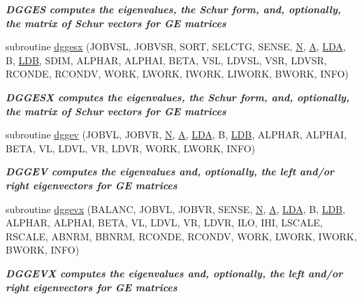 \begin{DoxyCompactItemize}
\begin{DoxyCompactList}\small\item\em {\bfseries  D\+G\+G\+E\+S computes the eigenvalues, the Schur form, and, optionally, the matrix of Schur vectors for G\+E matrices} \end{DoxyCompactList}\item 
subroutine \hyperlink{group__doubleGEeigen_ga923e1df287c0a880641462ce42607936}{dggesx} (J\+O\+B\+V\+S\+L, J\+O\+B\+V\+S\+R, S\+O\+R\+T, S\+E\+L\+C\+T\+G, S\+E\+N\+S\+E, \hyperlink{polmisc_8c_a0240ac851181b84ac374872dc5434ee4}{N}, \hyperlink{classA}{A}, \hyperlink{example__user_8c_ae946da542ce0db94dced19b2ecefd1aa}{L\+D\+A}, B, \hyperlink{example__user_8c_a50e90a7104df172b5a89a06c47fcca04}{L\+D\+B}, S\+D\+I\+M, A\+L\+P\+H\+A\+R, A\+L\+P\+H\+A\+I, B\+E\+T\+A, V\+S\+L, L\+D\+V\+S\+L, V\+S\+R, L\+D\+V\+S\+R, R\+C\+O\+N\+D\+E, R\+C\+O\+N\+D\+V, W\+O\+R\+K, L\+W\+O\+R\+K, I\+W\+O\+R\+K, L\+I\+W\+O\+R\+K, B\+W\+O\+R\+K, I\+N\+F\+O)
\begin{DoxyCompactList}\small\item\em {\bfseries  D\+G\+G\+E\+S\+X computes the eigenvalues, the Schur form, and, optionally, the matrix of Schur vectors for G\+E matrices} \end{DoxyCompactList}\item 
subroutine \hyperlink{group__doubleGEeigen_ga4f59e87e670a755b41cbdd7e97f36bea}{dggev} (J\+O\+B\+V\+L, J\+O\+B\+V\+R, \hyperlink{polmisc_8c_a0240ac851181b84ac374872dc5434ee4}{N}, \hyperlink{classA}{A}, \hyperlink{example__user_8c_ae946da542ce0db94dced19b2ecefd1aa}{L\+D\+A}, B, \hyperlink{example__user_8c_a50e90a7104df172b5a89a06c47fcca04}{L\+D\+B}, A\+L\+P\+H\+A\+R, A\+L\+P\+H\+A\+I, B\+E\+T\+A, V\+L, L\+D\+V\+L, V\+R, L\+D\+V\+R, W\+O\+R\+K, L\+W\+O\+R\+K, I\+N\+F\+O)
\begin{DoxyCompactList}\small\item\em {\bfseries  D\+G\+G\+E\+V computes the eigenvalues and, optionally, the left and/or right eigenvectors for G\+E matrices} \end{DoxyCompactList}\item 
subroutine \hyperlink{group__doubleGEeigen_ga58099bb0f4ebe6a1f6f6078e05a6fb78}{dggevx} (B\+A\+L\+A\+N\+C, J\+O\+B\+V\+L, J\+O\+B\+V\+R, S\+E\+N\+S\+E, \hyperlink{polmisc_8c_a0240ac851181b84ac374872dc5434ee4}{N}, \hyperlink{classA}{A}, \hyperlink{example__user_8c_ae946da542ce0db94dced19b2ecefd1aa}{L\+D\+A}, B, \hyperlink{example__user_8c_a50e90a7104df172b5a89a06c47fcca04}{L\+D\+B}, A\+L\+P\+H\+A\+R, A\+L\+P\+H\+A\+I, B\+E\+T\+A, V\+L, L\+D\+V\+L, V\+R, L\+D\+V\+R, I\+L\+O, I\+H\+I, L\+S\+C\+A\+L\+E, R\+S\+C\+A\+L\+E, A\+B\+N\+R\+M, B\+B\+N\+R\+M, R\+C\+O\+N\+D\+E, R\+C\+O\+N\+D\+V, W\+O\+R\+K, L\+W\+O\+R\+K, I\+W\+O\+R\+K, B\+W\+O\+R\+K, I\+N\+F\+O)
\begin{DoxyCompactList}\small\item\em {\bfseries  D\+G\+G\+E\+V\+X computes the eigenvalues and, optionally, the left and/or right eigenvectors for G\+E matrices} \end{DoxyCompactList}\end{DoxyCompactItemize}


